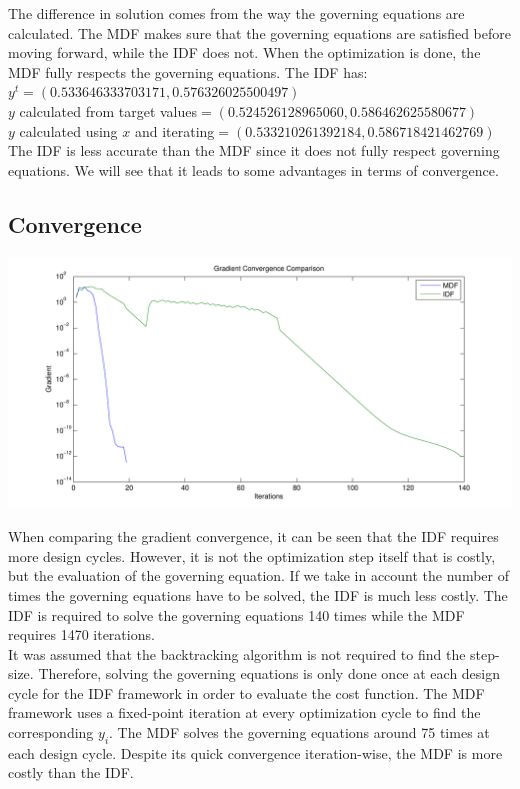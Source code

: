 \documentclass[letterpaper,12pt]{article}
\begin{document}
The difference in solution comes from the way the governing equations are calculated. The MDF makes sure that the governing equations are satisfied before moving forward, while the IDF does not. When the optimization is done, the MDF fully respects the governing equations. The IDF has:\\
$y^t=(0.533646333703171,0.576326025500497)$\\
$y$ calculated from target values$=(0.524526128965060,0.586462625580677)$\\
$y$ calculated using $x$ and iterating$=(0.533210261392184,0.586718421462769)$\\

The IDF is less accurate than the MDF since it does not fully respect governing equations. We will see that it leads to some advantages in terms of convergence.

\subsection{Convergence}

\begin{center}
\includegraphics[scale=0.6]{GradConvComp}
\label{GradConvComp}
\end{center}

When comparing the gradient convergence, it can be seen that the IDF requires more design cycles. However, it is not the optimization step itself that is costly, but the evaluation of the governing equation. If we take in account the number of times the governing equations have to be solved, the IDF is much less costly. The IDF is required to solve the governing equations 140 times while the MDF requires 1470 iterations.\\

It was assumed that the backtracking algorithm is not required to find the step-size. Therefore, solving the governing equations is only done once at each design cycle for the IDF framework in order to evaluate the cost function. The MDF framework uses a fixed-point iteration at every optimization cycle to find the corresponding $y_i$. The MDF solves the governing equations around 75 times at each design cycle. Despite its quick convergence iteration-wise, the MDF is more costly than the IDF.\\
\end{document}
